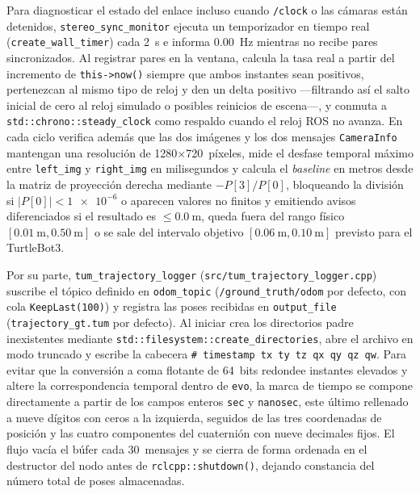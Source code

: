 Para diagnosticar el estado del enlace incluso cuando \texttt{/clock} o las cámaras están detenidos, \texttt{stereo\_sync\_monitor} ejecuta un temporizador en tiempo real (\texttt{create\_wall\_timer}) cada \qty{2}{\second} e informa \qty{0.00}{\hertz} mientras no recibe pares sincronizados. Al registrar pares en la ventana, calcula la tasa real a partir del incremento de \texttt{this->now()} siempre que ambos instantes sean positivos, pertenezcan al mismo tipo de reloj y den un delta positivo ---filtrando así el salto inicial de cero al reloj simulado o posibles reinicios de escena---, y conmuta a \texttt{std::chrono::steady\_clock} como respaldo cuando el reloj ROS no avanza. En cada ciclo verifica además que las dos imágenes y los dos mensajes \texttt{CameraInfo} mantengan una resolución de \num{1280}\(\times\)\num{720}~píxeles, mide el desfase temporal máximo entre \texttt{left\_img} y \texttt{right\_img} en milisegundos y calcula el \textit{baseline} en metros desde la matriz de proyección derecha mediante \(-P[3]/P[0]\), bloqueando la división si \(|P[0]| < \num{1e-6}\) o aparecen valores no finitos y emitiendo avisos diferenciados si el resultado es \(\le \qty{0.0}{\meter}\), queda fuera del rango físico \([\qty{0.01}{\meter}, \qty{0.50}{\meter}]\) o se sale del intervalo objetivo \([\qty{0.06}{\meter}, \qty{0.10}{\meter}]\) previsto para el TurtleBot3.

Por su parte, \texttt{tum\_trajectory\_logger} (\texttt{src/tum\_trajectory\_logger.cpp}) suscribe el tópico definido en \texttt{odom\_topic} (\texttt{/ground\_truth/odom} por defecto, con cola \texttt{KeepLast(100)}) y registra las poses recibidas en \texttt{output\_file} (\texttt{trajectory\_gt.tum} por defecto). Al iniciar crea los directorios padre inexistentes mediante \texttt{std::filesystem::create\_directories}, abre el archivo en modo truncado y escribe la cabecera \texttt{\# timestamp tx ty tz qx qy qz qw}. Para evitar que la conversión a coma flotante de \num{64}~bits redondee instantes elevados y altere la correspondencia temporal dentro de \texttt{evo}, la marca de tiempo se compone directamente a partir de los campos enteros \texttt{sec} y \texttt{nanosec}, este último rellenado a nueve dígitos con ceros a la izquierda, seguidos de las tres coordenadas de posición y las cuatro componentes del cuaternión con nueve decimales fijos. El flujo vacía el búfer cada \num{30}~mensajes y se cierra de forma ordenada en el destructor del nodo antes de \texttt{rclcpp::shutdown()}, dejando constancia del número total de poses almacenadas.

